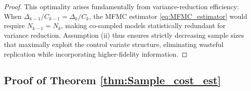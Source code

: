 \begin{proof}
This optimality arises fundamentally from variance-reduction efficiency: When $\Delta_{k-1}/C_{k-1} = \Delta_k/C_k$, the MFMC estimator \eqref{eq:MFMC_estimator} would require $N_{k-1} = N_k$, making co-sampled models statistically redundant for variance reduction. Assumption (ii) thus ensures strictly decreasing sample sizes that maximally exploit the control variate structure, eliminating wasteful replication while incorporating higher-fidelity information.















\end{proof}



\subsection{Proof of Theorem \ref{thm:Sample_cost_est}}

